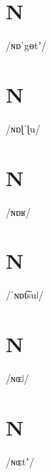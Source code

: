 \documentclass[10pt,a4paper,twoside]{book}
\begin{document}
\section*{N}

\begin{multicols}{3}
 {/ɴɒˈgɵtʼ/} {}
\end{multicols}

\section*{N}

\begin{multicols}{3}
 {/ɴɒɭˈɭu/} {}
\end{multicols}

\section*{N}

\begin{multicols}{3}
 {/ɴɒʁ/} {}
\end{multicols}

\section*{N}

\begin{multicols}{3}
 {/ˈɴɒt͡suǀ/} {}
\end{multicols}

\section*{N}

\begin{multicols}{3}
 {/ɴɶǀ/} {}
\end{multicols}

\section*{N}

\begin{multicols}{3}
 {/ɴɶtʼ/} {}
\end{multicols}
\end{document}
